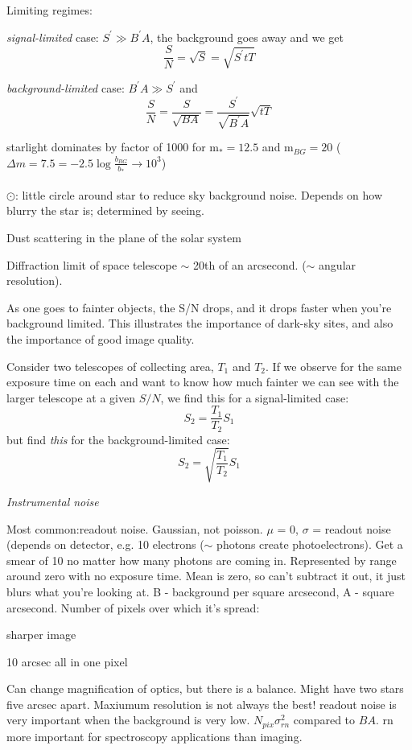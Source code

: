 \documentclass[12pt]{article}
\begin{document}
Limiting regimes:
\begin{itemize*}
    \item \emph{signal-limited} case: $S^{\prime}\gg B^{\prime}A$,
        the background goes away and we get
         $$ \frac{S}{N} = \sqrt{S} = \sqrt{S^{\prime}tT} $$
    \item \emph{background-limited} case: $B^{\prime}A\gg S^{\prime}$
        and
        $$ \frac{S}{N} = \frac{S}{\sqrt{BA}} =
        \frac{S^{\prime}}{\sqrt{B^{\prime}A}}\sqrt{tT} $$
\end{itemize*}

\textcolor{myBlue}{starlight dominates by factor of 1000 for
m$_* = 12.5$ and m$_{BG} = 20$ ($\Delta m = 7.5
= -2.5\log\frac{b_{BG}}{b_*}
\rightarrow 10^3$)\\\\
\large$\odot$: \normalsize little circle around star to reduce sky
background noise. Depends on how blurry the star is; determined by
seeing.
\begin{itemize*}
    \item Dust scattering in the plane of the solar system
    \item Diffraction limit of space telescope $\sim$ 20th of an
    arcsecond. ($\sim$ angular resolution).
\end{itemize*}
}

As one goes to fainter objects, the S/N drops, and it drops faster
when you're background limited. This illustrates the importance of
dark-sky sites, and also the importance of good image quality.

Consider two telescopes of collecting area, $T_1$ and $T_2$.
If we observe for the same exposure time on each and want to know how
much fainter we can see with the larger telescope at a given $S/N$, we
find this for a signal-limited case:
$$ S_2 = \frac{T_1}{T_2}S_1 $$
but find \emph{this} for the background-limited case:
$$ S_2 = \sqrt{\frac{T_1}{T_2}}S_1  $$


\textcolor{om}{\emph{}}

\emph{Instrumental noise}

\textcolor{myBlue}{Most common:readout noise. Gaussian, not poisson.
$\mu$ = 0, $\sigma$ = readout noise (depends on detector, e.g. 10
electrons ($\sim$ photons create photoelectrons). Get a smear of 10 no
matter how many photons are coming in. Represented by range around
zero with no exposure time. Mean is zero, so can't subtract it out, it
just blurs what you're looking at. B - background per square
arcsecond, A - square arcsecond. Number of pixels over which it's
spread:
\begin{itemize*}
    \item sharper image
    \item 10 arcsec all in one pixel
\end{itemize*}
Can change magnification of optics, but there is a balance. Might have
two stars five arcsec apart. Maxiumum resolution is not always the
best! readout noise is very important when the background is very low.
$N_{pix}\sigma_{rn}^2$ compared to $BA$. rn more important for
spectroscopy applications than imaging.
}
\end{document}
